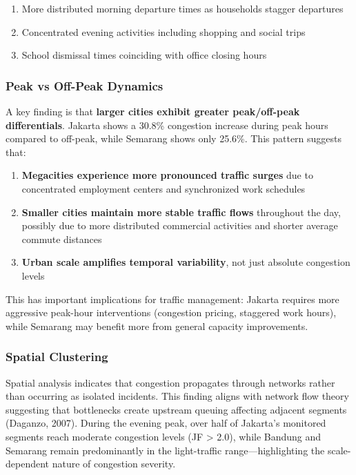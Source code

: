 \documentclass[12pt,a4paper]{article}
\begin{document}
\begin{enumerate}
\def\labelenumi{\arabic{enumi}.}

\item
  More distributed morning departure times as households stagger departures
\item
  Concentrated evening activities including shopping and social trips
\item
  School dismissal times coinciding with office closing hours
\end{enumerate}

\subsubsection{Peak vs Off-Peak Dynamics}

A key finding is that \textbf{larger cities exhibit greater peak/off-peak differentials}. Jakarta shows a 30.8\% congestion increase during peak hours compared to off-peak, while Semarang shows only 25.6\%. This pattern suggests that:

\begin{enumerate}
\def\labelenumi{\arabic{enumi}.}

\item
  \textbf{Megacities experience more pronounced traffic surges} due to concentrated employment centers and synchronized work schedules
\item
  \textbf{Smaller cities maintain more stable traffic flows} throughout the day, possibly due to more distributed commercial activities and shorter average commute distances
\item
  \textbf{Urban scale amplifies temporal variability}, not just absolute congestion levels
\end{enumerate}

This has important implications for traffic management: Jakarta requires more aggressive peak-hour interventions (congestion pricing, staggered work hours), while Semarang may benefit more from general capacity improvements.

\subsubsection{Spatial Clustering}

Spatial analysis indicates that congestion propagates through networks rather than occurring as isolated incidents. This finding aligns with network flow theory suggesting that bottlenecks create upstream queuing affecting adjacent segments (Daganzo, 2007). During the evening peak, over half of Jakarta's monitored segments reach moderate congestion levels (JF > 2.0), while Bandung and Semarang remain predominantly in the light-traffic range---highlighting the scale-dependent nature of congestion severity.
\end{document}
